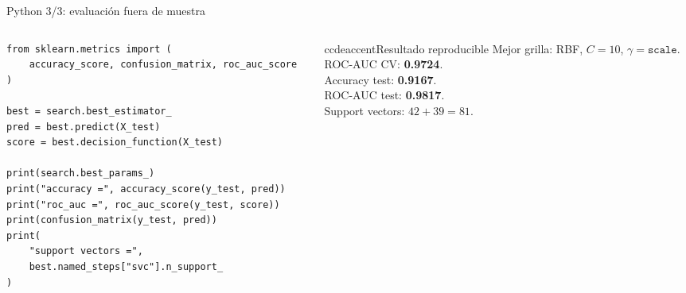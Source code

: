 \begin{frame}[fragile]{Python 3/3: evaluación fuera de muestra}
\scriptsize
\begin{columns}[T,onlytextwidth]
\begin{column}{0.65\textwidth}
\begin{lstlisting}[style=ccdepython]
from sklearn.metrics import (
    accuracy_score, confusion_matrix, roc_auc_score
)

best = search.best_estimator_
pred = best.predict(X_test)
score = best.decision_function(X_test)

print(search.best_params_)
print("accuracy =", accuracy_score(y_test, pred))
print("roc_auc =", roc_auc_score(y_test, score))
print(confusion_matrix(y_test, pred))
print(
    "support vectors =",
    best.named_steps["svc"].n_support_
)
\end{lstlisting}
\end{column}
\begin{column}{0.31\textwidth}
\begin{contrastbox}{ccdeaccent}{Resultado reproducible}
\scriptsize
Mejor grilla: RBF, $C=10$, $\gamma=\texttt{scale}$.\\[0.10cm]
ROC-AUC CV: \textbf{0.9724}.\\
Accuracy test: \textbf{0.9167}.\\
ROC-AUC test: \textbf{0.9817}.\\
Support vectors: $42+39=81$.
\end{contrastbox}
\end{column}
\end{columns}
\end{frame}

